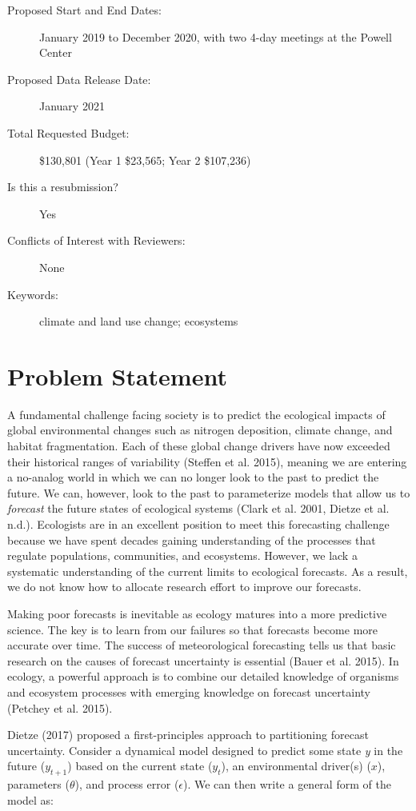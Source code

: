 \documentclass[12pt,]{article}
\begin{document}
\begin{description}
\item[Proposed Start and End Dates:] January 2019 to December 2020, with two 4-day meetings at the Powell Center
\item[Proposed Data Release Date:] January 2021
\item[Total Requested Budget:] \$130,801 (Year 1 \$23,565; Year 2 \$107,236)
\item[Is this a resubmission?] Yes
\item[Conflicts of Interest with Reviewers:] None
\item[Keywords:] climate and land use change; ecosystems
\end{description}

\newpage{}


\section{Problem Statement}

A fundamental challenge facing society is to predict the ecological
impacts of global environmental changes such as nitrogen deposition,
climate change, and habitat fragmentation. Each of these global change
drivers have now exceeded their historical ranges of variability
(Steffen et al. 2015), meaning we are entering a no-analog world in
which we can no longer look to the past to predict the future. We can,
however, look to the past to parameterize models that allow us to
\emph{forecast} the future states of ecological systems (Clark et al.
2001, Dietze et al. n.d.). Ecologists are in an excellent position to
meet this forecasting challenge because we have spent decades gaining
understanding of the processes that regulate populations, communities,
and ecosystems. However, we lack a systematic understanding of the
current limits to ecological forecasts. As a result, we do not know how
to allocate research effort to improve our forecasts.

Making poor forecasts is inevitable as ecology matures into a more
predictive science. The key is to learn from our failures so that
forecasts become more accurate over time. The success of meteorological
forecasting tells us that basic research on the causes of forecast
uncertainty is essential (Bauer et al. 2015). In ecology, a powerful
approach is to combine our detailed knowledge of organisms and ecosystem
processes with emerging knowledge on forecast uncertainty (Petchey et
al. 2015).

Dietze (2017) proposed a first-principles approach to partitioning
forecast uncertainty. Consider a dynamical model designed to predict
some state \emph{y} in the future (\(y_{t+1}\)) based on the current
state (\(y_{t}\)), an environmental driver(s) (\(x\)), parameters
(\(\theta\)), and process error (\(\epsilon\)). We can then write a
general form of the model as: \vspace{-3em}
\end{document}
